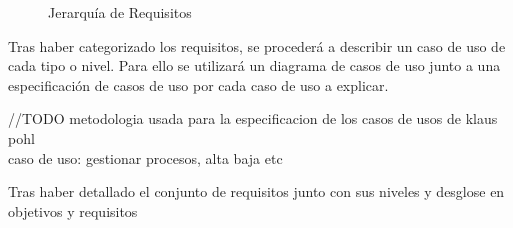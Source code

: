 	\begin{figure}[H]
		\centering
		\caption{Jerarquía de Requisitos}\label{fig:esquemaObjetivos}
	\end{figure}

	Tras haber categorizado los requisitos, se procederá a describir un caso de uso de cada tipo o nivel. Para ello se utilizará un diagrama de casos de uso junto a una especificación de casos de uso por cada caso de uso a explicar.

	\vspace{5mm}
	//TODO
	metodologia usada para la especificacion de los casos de usos de klaus pohl\\
	
	caso de uso: gestionar procesos, alta baja etc
	
	\vspace{5mm}
	
	Tras haber detallado el conjunto de requisitos junto con sus niveles y desglose en objetivos y requisitos

	
	